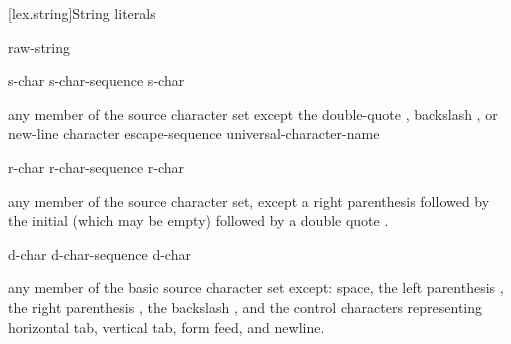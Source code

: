 [lex.string]{String literals}

%
\begin{bnf}
\br
       \br
      raw-string
\end{bnf}

\begin{bnf}
\br
    s-char\br
    s-char-sequence s-char
\end{bnf}

\begin{bnf}
\br
    \textnormal{any member of the source character set except the double-quote , backslash \terminal{\textbackslash}, or new-line character}\br
    escape-sequence\br
    universal-character-name
\end{bnf}

\begin{bnf}
\br
      \terminal{(}  \terminal{)}  
\end{bnf}

\begin{bnf}
\br
    r-char\br
    r-char-sequence r-char
\end{bnf}

\begin{bnf}
\br
    \textnormal{any member of the source character set, except a right parenthesis \terminal{)} followed by}\br
    \bnfindent\textnormal{the initial  (which may be empty) followed by a double quote .}
\end{bnf}

\begin{bnf}
\br
    d-char\br
    d-char-sequence d-char
\end{bnf}

\begin{bnf}
\br
    \textnormal{any member of the basic source character set except:}\br
    \bnfindent\textnormal{space, the left parenthesis \terminal{(}, the right parenthesis \terminal{)}, the backslash \terminal{\textbackslash}, and the control characters}\br
    \bnfindent\textnormal{representing horizontal tab, vertical tab, form feed, and newline.}
\end{bnf}

